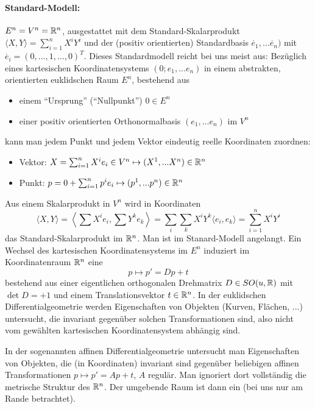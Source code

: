 \paragraph*{Standard-Modell:} \(E^n = V^n = \mathbb{R}^n\), ausgestattet mit dem Standard-Skalarprodukt \(\langle X, Y \rangle = \sum_{i=1}^n X^iY^i\) und der (positiv orientierten) Standardbasis \(\mathring{e_1}, ... \mathring{e_n})\) mit \(\mathring{e_i} = (0, \dots, 1, \dots, 0)^T\).
Dieses Standardmodell reicht bei uns meist aus:
Bezüglich eines kartesischen Koordinatensystems \((0; e_1, ... e_n)\) in einem abstrakten, orientierten euklidschen Raum \(E^n\), bestehend aus 
  \begin{itemize}
   \item einem "`Ursprung"' ("`Nullpunkt"') \(0 \in E^n\)
   \item einer positiv orientierten Orthonormalbasis \((e_1, ... e_n)\) im \(V^n\)
  \end{itemize}
kann man jedem Punkt und jedem Vektor eindeutig reelle Koordinaten zuordnen:
  \begin{itemize}
   \item Vektor: \(X = \sum_{i=1}^n X^ie_i \in V^n \mapsto (X^1, ... X^n) \in \mathbb{R}^n\)
   \item Punkt: \(p = 0 + \sum_{i=1}^n p^ie_i \mapsto (p^1, ... p^n) \in \mathbb{R}^n\)
  \end{itemize}
Aus einem Skalarprodukt in \(V^n\) wird in Koordinaten
  \[
   \langle X, Y \rangle = \left\langle \sum X^ie_i, \sum Y^ke_k \right\rangle = \sum_{i}\sum_{k} X^iY^k \langle e_i, e_k \rangle = \sum_{i=1}^n X^iY^i
  \]
das Standard-Skalarprodukt im \(\mathbb{R}^n\).
Man ist im Stanard-Modell angelangt.
Ein Wechsel des kartesischen Koordinatensystems im \(E^n\) induziert im Koordinatenraum \(\mathbb{R}^n\) eine  \[p \mapsto p' = Dp + t\] bestehend aus einer eigentlichen orthogonalen Drehmatrix \(D \in SO(u, \mathbb{R})\) mit \(\det D = +1\) und einem Translationsvektor \(t \in \mathbb{R}^n\).
In der euklidschen Differentialgeometrie werden Eigenschaften von Objekten (Kurven, Flächen, ...) untersucht, die invariant gegenüber solchen Transformationen sind, also nicht vom gewählten kartesischen Koordinatensystem abhängig sind. \\
  \begin{bemerkung} In der sogenannten affinen Differentialgeometrie untersucht man Eigenschaften von Objekten, die (in Koordinaten) invariant sind gegenüber beliebigen affinen Transformationen \(p \mapsto p' = Ap + t\), \(A\) regulär. Man ignoriert dort vollständig die metrische Struktur des \(\mathbb{R}^n\).
  Der umgebende Raum ist dann ein  (bei uns nur am Rande betrachtet).
  \end{bemerkung}

